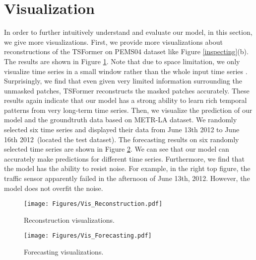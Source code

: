\documentclass[sigconf]{acmart}
\begin{document}
 
\section{Visualization}
\label{appendix_visualization}
In order to further intuitively understand and evaluate our model, in this section, we give more visualizations.
First, we provide more visualizations about reconstructions of the TSFormer on PEMS04 dataset like Figure \ref{inspecting}(b).
The results are shown in Figure \ref{vis_rec}. 
Note that due to space limitation, we only visualize time series in a small window rather than the whole input time series .
Surprisingly, we find that even given very limited information surrounding the unmasked patches, TSFormer reconstructs the masked patches accurately.
These results again indicate that our model has a strong ability to learn rich temporal patterns from very long-term time series.
Then, we visualize the prediction of our model and the groundtruth data based on METR-LA dataset.
We randomly selected six time series and displayed their data from June 13th 2012 to June 16th 2012~(located the test dataset).
The forecasting results on six randomly selected time series are shown in Figure \ref{vis_for}.
We can see that our model can accurately make predictions for different time series.
Furthermore, we find that the model has the ability to resist noise. 
For example, in the right top figure, the traffic sensor apparently failed in the afternoon of June 13th, 2012. 
However, the model does not overfit the noise.






\begin{figure}[ht]
\centering
  \texttt{[image: Figures/Vis\_Reconstruction.pdf]}
  \caption{Reconstruction visualizations.}
  \label{vis_rec}
\end{figure}

\begin{figure}[ht]
  \centering
  \texttt{[image: Figures/Vis\_Forecasting.pdf]}
  \caption{Forecasting visualizations.}
  \label{vis_for}
\end{figure} 
\end{document}
